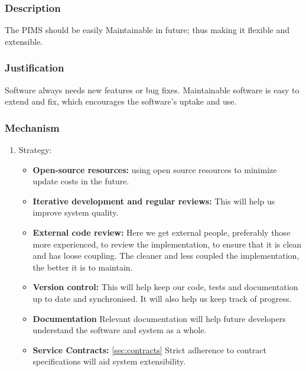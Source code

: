 \subsubsection*{Description}
The PIMS should be easily Maintainable in future; thus making it flexible and extensible.
		
\subsubsection*{Justification}
Software always needs new features or bug fixes. Maintainable software is easy to extend and fix, which encourages the software's uptake and use.
	
\subsubsection*{Mechanism}	
\begin{enumerate}
\item Strategy:
	\begin{itemize}
		\item \textbf{Open-source resources:} using open source resources to minimize update costs in the future.
		\item \textbf{Iterative development and regular reviews:} This will help us improve system quality.
		\item \textbf{External code review:} Here we get external people, preferably those more experienced, to review the implementation, to ensure that it is clean and has loose coupling. The cleaner and less coupled the implementation, the better it is to maintain.
		\item \textbf{Version control:} This will help keep our code, tests and documentation up to date and synchronised. It will also help us keep track of progress.
		\item \textbf{Documentation} Relevant documentation will help future developers understand the software and system as a whole.
		\item \textbf{Service Contracts:} \ref{sec:contracts} Strict adherence to contract specifications will aid system extensibility.
\end{itemize}
					
\end{enumerate}